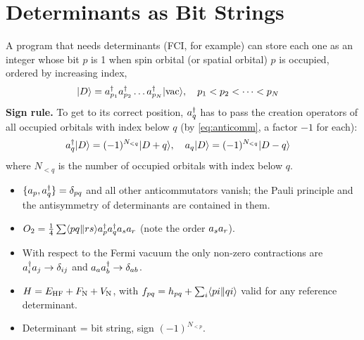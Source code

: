 \section{Determinants as Bit Strings}

A program that needs determinants (FCI, for example) can store each one as an integer whose bit $p$ is 1 when spin orbital (or spatial orbital) $p$ is occupied, ordered by increasing index,
\begin{align*}
|D\rangle &= a^{\dagger}_{p_1} a^{\dagger}_{p_2} \dots a^{\dagger}_{p_N} |\text{vac}\rangle, \quad p_1 < p_2 < \dots < p_N
\end{align*}
\textbf{Sign rule.} To get to its correct position, $a^{\dagger}_{q}$ has to pass the creation operators of all occupied orbitals with index below $q$ (by \eqref{eq:anticomm}, a factor $-1$ for each):
\begin{align*}
a^{\dagger}_{q} |D\rangle &= (-1)^{N_{<q}} |D + q\rangle, \quad a_q |D\rangle = (-1)^{N_{<q}} |D - q\rangle
\end{align*}
where $N_{<q}$ is the number of occupied orbitals with index below $q$.

\begin{summary}
\begin{itemize}
\item $\{a_p, a^{\dagger}_{q}\} = \delta_{pq}$ and all other anticommutators vanish; the Pauli principle and the antisymmetry of determinants are contained in them.
\item $O_2 = \frac{1}{4} \sum \langle pq\Vert rs\rangle a^{\dagger}_{p} a^{\dagger}_{q} a_s a_r$ (note the order $a_{s} a_{r}$).
\item With respect to the Fermi vacuum the only non-zero contractions are $a^{\dagger}_{i} a_j \rightarrow \delta_{ij}$ and $a_a a^{\dagger}_{b} \rightarrow \delta_{ab}$.
\item $H = E_{\text{HF}} + F_{\mathrm{N}} + V_{\mathrm{N}}$, with $f_{pq} = h_{pq} + \sum_i \langle pi\Vert qi\rangle$ valid for any reference determinant.
\item Determinant = bit string, sign $(-1)^{N_{<p}}$.
\end{itemize}
\end{summary}
